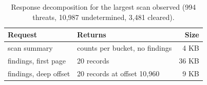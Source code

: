 \begin{table}[htbp]
\centering
\caption{Response decomposition for the largest scan observed (994 threats, 10,987 undetermined, 3,481 cleared).}
\label{tab:response}
\footnotesize
\begin{tabular}{l l r}
\hline
Request & Returns & Size \\
\hline
scan summary & counts per bucket, no findings & 4 KB \\
findings, first page & 20 records & 36 KB \\
findings, deep offset & 20 records at offset 10,960 & 9 KB \\
\hline
\end{tabular}
\end{table}
